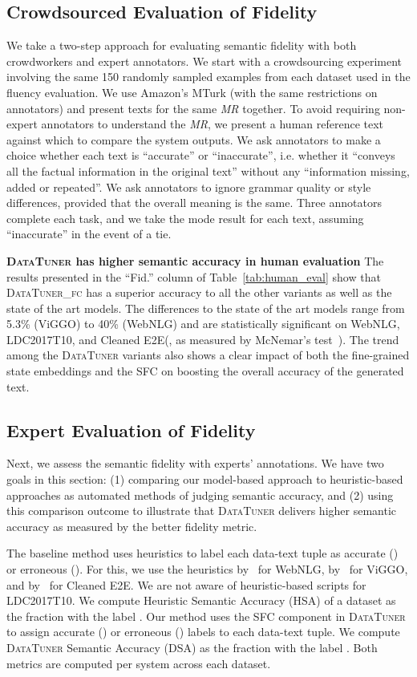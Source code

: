 \documentclass[11pt]{article}
\newcommand{\webnlg}{WebNLG\xspace}
\newcommand{\ldc}{LDC2017T10\xspace}
\newcommand{\viggo}{ViGGO\xspace}
\newcommand{\cleanedee}{Cleaned E2E\xspace}
\newcommand{\system}{\textsc{DataTuner}\xspace}
\newcommand{\systemFcPost}{\textsc{DataTuner\_fc}\xspace}
\newcommand{\sfc}{SFC\xspace}
\newcommand{\mr}{\textit{MR}\xspace}
\theoremstyle{definition}
\theoremstyle{break}
\begin{document}
\subsection{Crowdsourced Evaluation of Fidelity}
We take a two-step approach for evaluating semantic fidelity with both crowdworkers and expert annotators.
We start with a crowdsourcing experiment involving the same 150 randomly sampled examples from each dataset used in the fluency evaluation. We use Amazon's MTurk (with the same restrictions on annotators) and present texts for the same \mr together. To avoid requiring non-expert annotators to understand the \mr, we present a human reference text against which to compare the system outputs. We ask annotators to make a choice whether each text is ``accurate'' or ``inaccurate'', i.e. whether it ``conveys all the factual information in the original text'' without any ``information missing, added or repeated''. We ask annotators to ignore grammar quality or style differences, provided that the overall meaning is the same. Three annotators complete each task, and we take the mode result for each text, assuming ``inaccurate'' in the event of a tie. 

\textbf{\system has higher semantic accuracy in human evaluation}
 The results presented in the ``Fid.'' column of Table~\ref{tab:human_eval} show that  \systemFcPost has a superior accuracy to all the other variants as well as the state of the art models. The differences to the state of the art models range from 5.3\% (\viggo) to 40\% (\webnlg) and are statistically significant on \webnlg, \ldc, and \cleanedee (, as measured by McNemar's test~\cite{mcnemar1947note}).
 The trend among the \system variants also shows a clear impact of both the fine-grained state embeddings and the \sfc on boosting the overall accuracy of the generated text. 


\subsection{Expert Evaluation of Fidelity}
Next, we assess the semantic fidelity with experts' annotations. We have two goals in this section: (1) comparing our model-based approach to heuristic-based approaches as automated methods of judging semantic accuracy, and (2) using this comparison outcome to illustrate that \system delivers higher semantic accuracy as measured by the better fidelity metric.

The baseline method uses heuristics to label each data-text tuple as accurate () or erroneous (). For this, we use the heuristics by~ for \webnlg, by~ for \viggo, and by~ for \cleanedee. We are not aware of heuristic-based scripts for \ldc. We compute Heuristic Semantic Accuracy (HSA) of a dataset as the fraction with the label .
Our method uses the \sfc component in \system to assign accurate () or erroneous () labels to each data-text tuple. We compute \system Semantic Accuracy (DSA) as the fraction with the label .
Both metrics are computed per system across each dataset.
\end{document}
